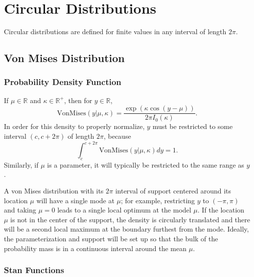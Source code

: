 \begin{description}
{\begin{description}
\begin{description}    \end{description}


\chapter{Circular Distributions}


Circular distributions are defined for finite values  in any interval of length $2\pi$.


\section{Von Mises Distribution}


\subsection{Probability Density Function}


If $\mu \in \mathbb{R}$ and $\kappa \in \mathbb{R}^+$, then for $y \in \mathbb{R}$, \[ \text{VonMises}(y|\mu,\kappa) = \frac{\exp(\kappa\cos(y-\mu))}{2\pi I_0(\kappa)} \!. \] In order for this density to properly normalize, $y$ must be restricted to some interval  $(c, c + 2\pi)$ of length $2 \pi$, because \[ \int_{c}^{c + 2\pi} \text{VonMises}(y|\mu,\kappa) dy = 1. \] Similarly, if $\mu$ is a parameter, it will typically be restricted to the same range as $y$.


A von Mises distribution with its $2 \pi$ interval of support centered around its location $\mu$ will have a single mode at $\mu$; for example, restricting $y$ to $(-\pi,\pi)$ and taking $\mu = 0$ leads to a single local optimum at the model $\mu$.  If the location $\mu$ is not in the center of the support, the density is circularly translated and there will be a second local maximum at the boundary furthest from the mode.  Ideally, the parameterization and support will be set up so that the bulk of the probability mass is in a continuous interval around the mean $\mu$.




\subsection{Stan Functions}



\end{description}}
\end{description}
